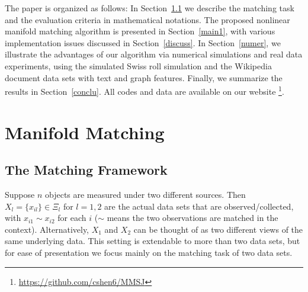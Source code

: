 \documentclass[times,twocolumn,final]{elsarticle}
\begin{document}
The paper is organized as follows: In Section~\ref{bg} we describe the matching task and the evaluation criteria in mathematical notations. The proposed nonlinear manifold matching algorithm is presented in Section~\ref{main1}, with various implementation issues discussed in Section~\ref{discuss}. In Section~\ref{numer}, we illustrate the advantages of our algorithm via numerical simulations and real data experiments, using the simulated Swiss roll simulation and the Wikipedia document data sets with text and graph features. Finally, we summarize the results in Section~\ref{conclu}. All codes and data are available on our website \footnote{\url{https://github.com/cshen6/MMSJ}}.
%
%
%
%
%
%
%

\section{Manifold Matching}
\label{main}

\subsection{The Matching Framework}
\label{bg}
Suppose $n$ objects are measured under two different sources. Then $X_{l}=\{x_{il}\} \in \Xi_{l}$ for $l=1, 2$ are the actual data sets that are observed/collected, with $x_{i1} \sim x_{i2}$ for each $i$ ($\sim$ means the two observations are matched in the context). Alternatively, $X_{1}$ and $X_{2}$ can be thought of as two different views of the same underlying data. This setting is extendable to more than two data sets, but for ease of presentation we focus mainly on the matching task of two data sets.
%
%
%
%
%
\end{document}
